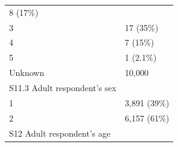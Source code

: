 \documentclass[]{article}
\begin{document}
\begin{longtable}[]{@{}ll@{}}
\begin{minipage}[t]{0.23\columnwidth}
8 (17\%)\strut
\end{minipage}\tabularnewline
\begin{minipage}[t]{0.71\columnwidth}\raggedright
3\strut
\end{minipage} & \begin{minipage}[t]{0.23\columnwidth}\raggedright
17 (35\%)\strut
\end{minipage}\tabularnewline
\begin{minipage}[t]{0.71\columnwidth}\raggedright
4\strut
\end{minipage} & \begin{minipage}[t]{0.23\columnwidth}\raggedright
7 (15\%)\strut
\end{minipage}\tabularnewline
\begin{minipage}[t]{0.71\columnwidth}\raggedright
5\strut
\end{minipage} & \begin{minipage}[t]{0.23\columnwidth}\raggedright
1 (2.1\%)\strut
\end{minipage}\tabularnewline
\begin{minipage}[t]{0.71\columnwidth}\raggedright
Unknown\strut
\end{minipage} & \begin{minipage}[t]{0.23\columnwidth}\raggedright
10,000\strut
\end{minipage}\tabularnewline
\begin{minipage}[t]{0.71\columnwidth}\raggedright
S11.3 Adult respondent's sex\strut
\end{minipage} & \begin{minipage}[t]{0.23\columnwidth}\raggedright
\strut
\end{minipage}\tabularnewline
\begin{minipage}[t]{0.71\columnwidth}\raggedright
1\strut
\end{minipage} & \begin{minipage}[t]{0.23\columnwidth}\raggedright
3,891 (39\%)\strut
\end{minipage}\tabularnewline
\begin{minipage}[t]{0.71\columnwidth}\raggedright
2\strut
\end{minipage} & \begin{minipage}[t]{0.23\columnwidth}\raggedright
6,157 (61\%)\strut
\end{minipage}\tabularnewline
\begin{minipage}[t]{0.71\columnwidth}\raggedright
S12 Adult respondent's age\strut
\end{minipage} & \begin{minipage}[t]{0.23\columnwidth}\raggedright

\end{minipage}
\end{longtable}
\end{document}
